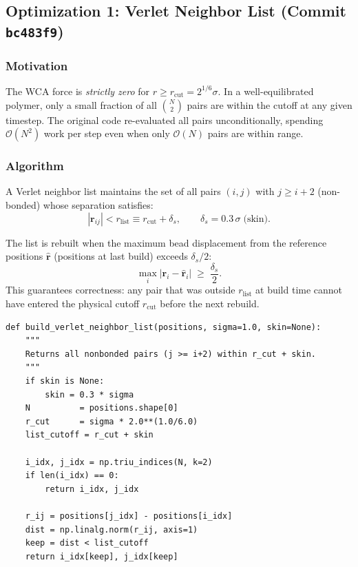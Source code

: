 \documentclass[12pt,a4paper]{article}
\newcommand{\Obig}[1]{\mathcal{O}\!\left(#1\right)}
\newcommand{\code}[1]{\texttt{#1}}
\begin{document}
\subsection{Optimization 1: Verlet Neighbor List (Commit \texttt{bc483f9})}
\label{sec:verlet}

\subsubsection{Motivation}
The WCA force is \emph{strictly zero} for $r \geq r_\text{cut} = 2^{1/6}\sigma$.
In a well-equilibrated polymer, only a small fraction of all $\binom{N}{2}$ pairs
are within the cutoff at any given timestep. The original code re-evaluated all
pairs unconditionally, spending $\Obig{N^2}$ work per step even when only
$\Obig{N}$ pairs are within range.

\subsubsection{Algorithm}
A Verlet neighbor list maintains the set of all pairs $(i, j)$ with $j \geq i+2$ 
(non-bonded) whose separation satisfies:
\begin{equation}
  |\mathbf{r}_{ij}| < r_\text{list} \equiv r_\text{cut} + \delta_s,
  \qquad \delta_s = 0.3\,\sigma \;\text{(skin)}.
  \label{eq:listcut}
\end{equation}

The list is rebuilt when the maximum bead displacement from the reference
positions $\hat{\mathbf{r}}$ (positions at last build) exceeds $\delta_s/2$:
\begin{equation}
  \max_{i}\!\left|\mathbf{r}_i - \hat{\mathbf{r}}_i\right| \;\geq\; \frac{\delta_s}{2}.
  \label{eq:rebuild}
\end{equation}
This guarantees correctness: any pair that was outside $r_\text{list}$ at build time
cannot have entered the physical cutoff $r_\text{cut}$ before the next rebuild.

\begin{lstlisting}[caption={New \code{build\_verlet\_neighbor\_list()} in \code{forces.py}.},
                   label={lst:vlist}]
def build_verlet_neighbor_list(positions, sigma=1.0, skin=None):
    """
    Returns all nonbonded pairs (j >= i+2) within r_cut + skin.
    """
    if skin is None:
        skin = 0.3 * sigma
    N          = positions.shape[0]
    r_cut      = sigma * 2.0**(1.0/6.0)
    list_cutoff = r_cut + skin

    i_idx, j_idx = np.triu_indices(N, k=2)
    if len(i_idx) == 0:
        return i_idx, j_idx

    r_ij = positions[j_idx] - positions[i_idx]
    dist = np.linalg.norm(r_ij, axis=1)
    keep = dist < list_cutoff
    return i_idx[keep], j_idx[keep]
\end{lstlisting}
\end{document}
